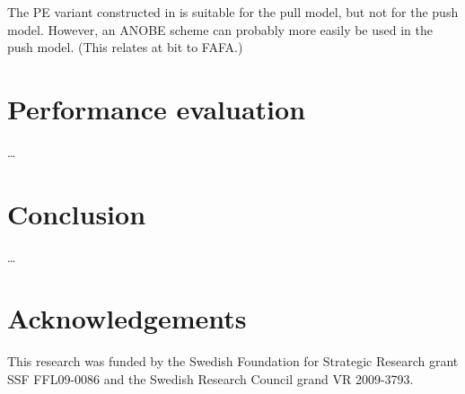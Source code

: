 The \ac{PE} variant constructed in \cite{predicateac} is suitable for the pull 
model, but not for the push model.
However, an \ac{ANOBE} scheme can probably more easily be used in the push 
model.
(This relates at bit to FAFA.)


\section{Performance evaluation}

\dots


\section{Conclusion}

\dots


\section*{Acknowledgements}

This research was funded by the Swedish Foundation for Strategic Research grant 
SSF FFL09-0086 and the Swedish Research Council grand VR 2009-3793.


\printbibliography
